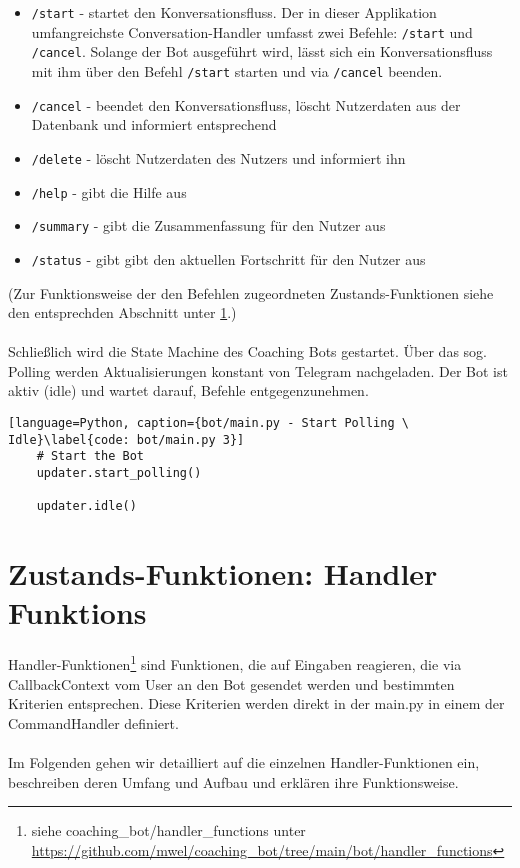         \begin{itemize}
            \item \verb|/start| - startet den Konversationsfluss. Der in dieser Applikation umfangreichste Conversation-Handler umfasst zwei Befehle: \verb|/start| und \verb|/cancel|. Solange der Bot ausgeführt wird, lässt sich ein Konversationsfluss mit ihm über den Befehl \verb|/start| starten und via \verb|/cancel| beenden.
            \item \verb|/cancel| - beendet den Konversationsfluss, löscht Nutzerdaten aus der Datenbank und informiert entsprechend
            \item \verb|/delete| - löscht Nutzerdaten des Nutzers und informiert ihn
            \item \verb|/help| - gibt die Hilfe aus
            \item \verb|/summary| - gibt die Zusammenfassung für den Nutzer aus
            \item \verb|/status| - gibt gibt den aktuellen Fortschritt für den Nutzer aus
        \end{itemize}
        (Zur Funktionsweise der den Befehlen zugeordneten Zustands-Funktionen siehe den entsprechden Abschnitt unter \ref{Implementierung: Handler Functions}.) \\ \\
        
        Schließlich wird die State Machine des Coaching Bots gestartet. Über das sog. Polling werden Aktualisierungen konstant von Telegram nachgeladen. Der Bot ist aktiv (idle) und wartet darauf, Befehle entgegenzunehmen.
        \begin{lstlisting}[language=Python, caption={bot/main.py - Start Polling \ Idle}\label{code: bot/main.py 3}]
    # Start the Bot
    updater.start_polling()

    updater.idle()
        \end{lstlisting}


    \section{Zustands-Funktionen: Handler Funktions} \label{Implementierung: Handler Functions}
        Handler-Funktionen\footnote{siehe coaching\_bot/handler\_functions unter \url{https://github.com/mwel/coaching_bot/tree/main/bot/handler_functions}} sind Funktionen, die auf Eingaben reagieren, die via CallbackContext vom User an den Bot gesendet werden und bestimmten Kriterien entsprechen. Diese Kriterien werden direkt in der main.py in einem der CommandHandler definiert. \\
        \\
        Im Folgenden gehen wir detailliert auf die einzelnen Handler-Funktionen ein, beschreiben deren Umfang und Aufbau und erklären ihre Funktionsweise. 

